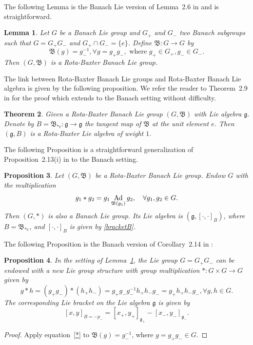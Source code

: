 \documentclass[a4paper,12pt,reqno]{amsart}%
\newtheorem{theorem}{Theorem}
\newtheorem{proposition}[theorem]{Proposition}
\newtheorem{lemma}[theorem]{Lemma}
\theoremstyle{definition}
\theoremstyle{remark}
\numberwithin{theorem}{section}
\numberwithin{equation}{section}
\newcommand{\1}{{\bf 1}}
\DeclareMathOperator{\Ad}{\textnormal{Ad}}
\newcommand{\g}{{\mathfrak g}}
\begin{document}
The following Lemma is the Banach Lie version of Lemma~2.6 in \cite{guo2021} and is straightforward.
\begin{lemma}\label{rota}
Let $G$ be a Banach Lie group and $G_+$ and $G_-$ two Banach subgroups such that $G = G_+ G_-$ and $G_+\cap G_- = \{e\}$. Define $\mathfrak{B}: G \rightarrow G$ by 
\[
\mathfrak{B}(g) = g_-^{-1}, \forall g = g_+ g_-, \textrm{  where  } g_+\in G_+, g_-\in G_-.
\]
Then $(G, \mathfrak{B})$ is a Rota-Baxter Banach Lie group.
\end{lemma}
The link between Rota-Baxter Banach Lie groups and  Rota-Baxter Banach Lie algebra is given by the following proposition. We refer the reader to Theorem~2.9 in \cite{guo2021} for the proof which extends to the Banach setting without difficulty.
\begin{theorem}
  Given a Rota-Baxter Banach Lie group $(G, \mathfrak{B})$ with Lie algebra $\g$. Denote by $B = \mathfrak{B}_{*e}: \g\rightarrow \g$ the tangent map of $\mathfrak{B}$ at the unit element $e$. Then $(\g, B)$ is a Rota-Baxter Lie algebra of weight $1$.
\end{theorem}
The following Proposition is a straightforward generalization of Proposition~2.13(i) in \cite{guo2021} to the Banach setting.
\begin{proposition}
    Let $(G, \mathfrak{B})$ be a Rota-Baxter Banach Lie group.  Endow $G$ with the multiplication
    \begin{equation}\label{*}
    g_1*g_2 = g_1\Ad_{\mathfrak{B}(g_1)}g_2, \quad \forall g_1, g_2 \in G.
    \end{equation}
    Then $(G, *)$ is also a Banach Lie group. Its Lie algebra is $(\g, [\cdot, \cdot]_B)$, where $B = \mathfrak{B}_{*e}$, and $[\cdot, \cdot]_B$ is given by \eqref{bracketB}. 
\end{proposition}
The following Proposition is the Banach version of Corollary~2.14 in \cite{guo2021}: 
\begin{proposition}
    In the setting of Lemma~\ref{rota}, the Lie group $G = G_+G_-$ can be endowed with a new Lie group structure with group multiplication $*: G\times G \rightarrow G$ given by 
    \begin{equation}
        g * h = (g_+g_-) * (h_+h_-) = g_+g_- g_-^{-1} h_+h_- g_- =  g_+ h_+ h_- g_-, \forall g, h \in G.
    \end{equation}
    The corresponding Lie bracket on the Lie algebra $\g$ is given by
    \[
    [x, y]_{B = -p_{-}} = [x_+, y_+]_{\g_+} - [x_-, y_-]_{\g_-}.
    \]
\end{proposition}
\begin{proof}
    Apply equation~\eqref{*} to $\mathfrak{B}(g) = g_-^{-1}$, where $g = g_+g_-\in G$.
\end{proof}
\end{document}
